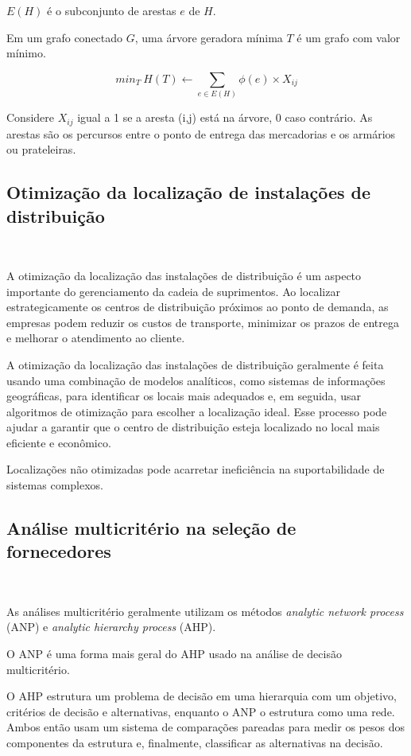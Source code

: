 \documentclass{abntex2}
\begin{document}
\begin{sloppypar}
$E(H)$ é o subconjunto de arestas $e$ de $H$.

Em um grafo conectado $G$, uma árvore geradora mínima $T$ é um grafo com valor mínimo.

\begin{equation} \label{eq:fo5}
	min_T\ H(T) \gets \sum_{e \in E(H)} \phi (e) \times X_{ij}
\end{equation}


Considere $X_{ij}$ igual a 1 se a aresta (i,j) está na árvore, 0 caso contrário. As arestas são os percursos entre o ponto de entrega das mercadorias e os armários ou prateleiras.



\subsection{Otimização da localização de instalações de distribuição}\

A otimização da localização das instalações de distribuição é um aspecto importante do gerenciamento da cadeia de suprimentos. Ao localizar estrategicamente os centros de distribuição próximos ao ponto de demanda, as empresas podem reduzir os custos de transporte, minimizar os prazos de entrega e melhorar o atendimento ao cliente.

A otimização da localização das instalações de distribuição geralmente é feita usando uma combinação de modelos analíticos, como sistemas de informações geográficas, para identificar os locais mais adequados e, em seguida, usar algoritmos de otimização para escolher a localização ideal. Esse processo pode ajudar a garantir que o centro de distribuição esteja localizado no local mais eficiente e econômico.

Localizações não otimizadas pode acarretar ineficiência na suportabilidade de sistemas complexos.

\subsection{Análise multicritério na seleção de fornecedores}\

As análises multicritério geralmente utilizam os métodos \textit{analytic network process} (ANP) e \textit{analytic hierarchy process} (AHP).

O ANP é uma forma mais geral do AHP usado na análise de decisão multicritério.

O AHP estrutura um problema de decisão em uma hierarquia com um objetivo, critérios de decisão e alternativas, enquanto o ANP o estrutura como uma rede. Ambos então usam um sistema de comparações pareadas para medir os pesos dos componentes da estrutura e, finalmente, classificar as alternativas na decisão.


\end{sloppypar}
\end{document}
